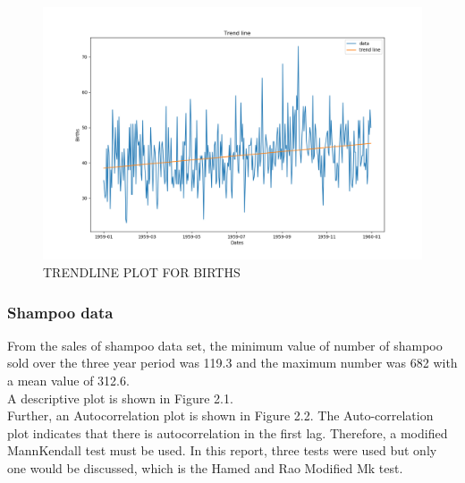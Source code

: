 \documentclass[12pt, letterpaper, twoside]{article}
\begin{document}
\begin{figure}[bp!]                                                                                                                                                                      \centering                                                                                                                                                                  \includegraphics[width=1\textwidth]{Birth_data_Trendline.png}                                                                                                                \caption{TRENDLINE PLOT FOR BIRTHS}                                                                                                                                         \label{fig:1.1}                                                                                                                                 \end{figure} 

\subsubsection{Shampoo data}
From the sales of shampoo data set, the minimum value of number of shampoo sold over the three year period was 119.3 and the maximum number was 682 with a mean value of 312.6.\\ A descriptive plot is shown in Figure 2.1.\\ 

Further, an Autocorrelation plot is shown in Figure 2.2. The Auto-correlation plot indicates that there is autocorrelation in the first lag. Therefore, a modified MannKendall test must be used. In this report, three tests were used but only one would be discussed, which is the Hamed and Rao Modified Mk test.
\end{document}

